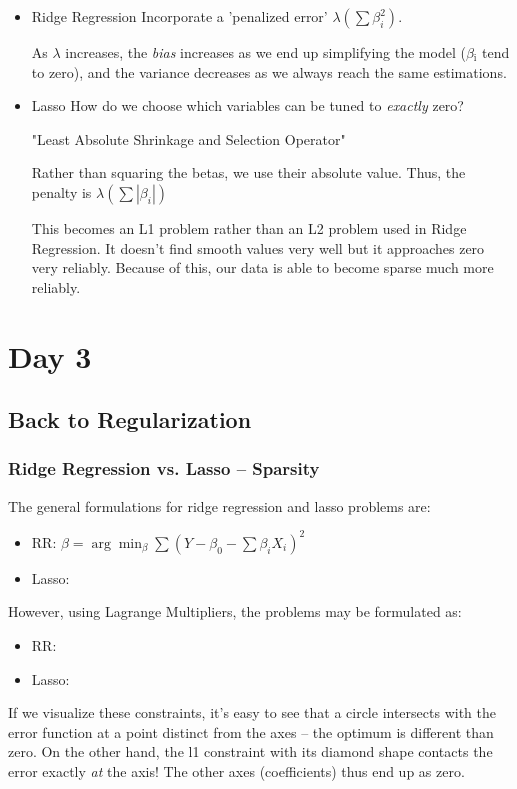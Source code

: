 \documentclass[11pt]{article}
\begin{document}
\begin{itemize}
\begin{itemize}
\item Ridge Regression
\label{sec-3-3-2-2}
Incorporate a 'penalized error' $\lambda \left(\sum\beta_i^2\right)$. 

As $\lambda$ increases, the \emph{bias} increases as we end up simplifying the model ($\beta$$_{\text{i}}$ tend to zero), and the variance decreases as we always reach the same estimations.

\item Lasso
\label{sec-3-3-2-3}
How do we choose which variables can be tuned to \emph{exactly} zero?

"Least Absolute Shrinkage and Selection Operator"

Rather than squaring the betas, we use their absolute value. Thus, the penalty is $\lambda\left(\sum|\beta_i|\right)$

This becomes an L1 problem rather than an L2 problem used in Ridge Regression. It doesn't find smooth values very well but it approaches zero very reliably. Because of this, our data is able to become sparse much more reliably.
\end{itemize}

\section*{Day 3}
\label{sec-4}

\subsection{Back to Regularization}
\label{sec-4-1}
\subsubsection*{Ridge Regression vs. Lasso -- Sparsity}
\label{sec-4-1-1}
The general formulations for ridge regression and lasso problems are:
\begin{itemize}
\item RR: $\beta = \arg\min_{\beta}\sum\left(Y - \beta_0 - \sum\beta_i X_i\right)^2$
\item Lasso:
\end{itemize}

However, using Lagrange Multipliers, the problems may be formulated as:
\begin{itemize}
\item RR:
\item Lasso:
\end{itemize}

If we visualize these constraints, it's easy to see that a circle intersects with the error function at a point distinct from the axes -- the optimum is different than zero. On the other hand, the l1 constraint with its diamond shape contacts the error exactly \emph{at} the axis! The other axes (coefficients) thus end up as zero.


\end{itemize}
\end{document}
